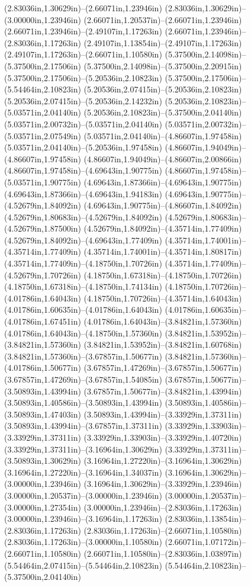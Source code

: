 (2.83036in,1.30629in)--(2.66071in,1.23946in) (2.83036in,1.30629in)--(3.00000in,1.23946in) (2.66071in,1.20537in)--(2.66071in,1.23946in) (2.66071in,1.23946in)--(2.49107in,1.17263in) (2.66071in,1.23946in)--(2.83036in,1.17263in) (2.49107in,1.13854in)--(2.49107in,1.17263in) (2.49107in,1.17263in)--(2.66071in,1.10580in) (5.37500in,2.14098in)--(5.37500in,2.17506in) (5.37500in,2.14098in)--(5.37500in,2.20915in) (5.37500in,2.17506in)--(5.20536in,2.10823in) (5.37500in,2.17506in)--(5.54464in,2.10823in) (5.20536in,2.07415in)--(5.20536in,2.10823in) (5.20536in,2.07415in)--(5.20536in,2.14232in) (5.20536in,2.10823in)--(5.03571in,2.04140in) (5.20536in,2.10823in)--(5.37500in,2.04140in) (5.03571in,2.00732in)--(5.03571in,2.04140in) (5.03571in,2.00732in)--(5.03571in,2.07549in) (5.03571in,2.04140in)--(4.86607in,1.97458in) (5.03571in,2.04140in)--(5.20536in,1.97458in) (4.86607in,1.94049in)--(4.86607in,1.97458in) (4.86607in,1.94049in)--(4.86607in,2.00866in) (4.86607in,1.97458in)--(4.69643in,1.90775in) (4.86607in,1.97458in)--(5.03571in,1.90775in) (4.69643in,1.87366in)--(4.69643in,1.90775in) (4.69643in,1.87366in)--(4.69643in,1.94183in) (4.69643in,1.90775in)--(4.52679in,1.84092in) (4.69643in,1.90775in)--(4.86607in,1.84092in) (4.52679in,1.80683in)--(4.52679in,1.84092in) (4.52679in,1.80683in)--(4.52679in,1.87500in) (4.52679in,1.84092in)--(4.35714in,1.77409in) (4.52679in,1.84092in)--(4.69643in,1.77409in) (4.35714in,1.74001in)--(4.35714in,1.77409in) (4.35714in,1.74001in)--(4.35714in,1.80817in) (4.35714in,1.77409in)--(4.18750in,1.70726in) (4.35714in,1.77409in)--(4.52679in,1.70726in) (4.18750in,1.67318in)--(4.18750in,1.70726in) (4.18750in,1.67318in)--(4.18750in,1.74134in) (4.18750in,1.70726in)--(4.01786in,1.64043in) (4.18750in,1.70726in)--(4.35714in,1.64043in) (4.01786in,1.60635in)--(4.01786in,1.64043in) (4.01786in,1.60635in)--(4.01786in,1.67451in) (4.01786in,1.64043in)--(3.84821in,1.57360in) (4.01786in,1.64043in)--(4.18750in,1.57360in) (3.84821in,1.53952in)--(3.84821in,1.57360in) (3.84821in,1.53952in)--(3.84821in,1.60768in) (3.84821in,1.57360in)--(3.67857in,1.50677in) (3.84821in,1.57360in)--(4.01786in,1.50677in) (3.67857in,1.47269in)--(3.67857in,1.50677in) (3.67857in,1.47269in)--(3.67857in,1.54085in) (3.67857in,1.50677in)--(3.50893in,1.43994in) (3.67857in,1.50677in)--(3.84821in,1.43994in) (3.50893in,1.40586in)--(3.50893in,1.43994in) (3.50893in,1.40586in)--(3.50893in,1.47403in) (3.50893in,1.43994in)--(3.33929in,1.37311in) (3.50893in,1.43994in)--(3.67857in,1.37311in) (3.33929in,1.33903in)--(3.33929in,1.37311in) (3.33929in,1.33903in)--(3.33929in,1.40720in) (3.33929in,1.37311in)--(3.16964in,1.30629in) (3.33929in,1.37311in)--(3.50893in,1.30629in) (3.16964in,1.27220in)--(3.16964in,1.30629in) (3.16964in,1.27220in)--(3.16964in,1.34037in) (3.16964in,1.30629in)--(3.00000in,1.23946in) (3.16964in,1.30629in)--(3.33929in,1.23946in) (3.00000in,1.20537in)--(3.00000in,1.23946in) (3.00000in,1.20537in)--(3.00000in,1.27354in) (3.00000in,1.23946in)--(2.83036in,1.17263in) (3.00000in,1.23946in)--(3.16964in,1.17263in) (2.83036in,1.13854in)--(2.83036in,1.17263in) (2.83036in,1.17263in)--(2.66071in,1.10580in) (2.83036in,1.17263in)--(3.00000in,1.10580in) (2.66071in,1.07172in)--(2.66071in,1.10580in) (2.66071in,1.10580in)--(2.83036in,1.03897in) (5.54464in,2.07415in)--(5.54464in,2.10823in) (5.54464in,2.10823in)--(5.37500in,2.04140in) 